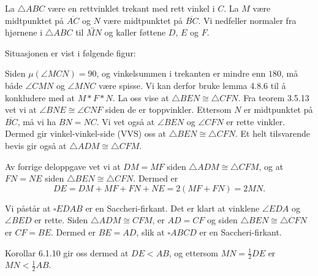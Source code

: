 \begin{oppgave}[6.1.5]
    La $\triangle ABC$ være en rettvinklet trekant med rett vinkel i $C$. 
    La $M$ være midtpunktet på $\overline{AC}$ og $N$ være midtpunktet på $\overline{BC}$. 
    Vi nedfeller normaler fra hjørnene i $\triangle ABC$ til $\overleftrightarrow{MN}$ og kaller føttene $D$, $E$ og $F$. 

    \begin{punkt}
        Situasjonen er vist i følgende figur: 

        \begin{figure}[H]
            \centering
             
        \end{figure}
    \end{punkt}

    \begin{punkt}
        Siden $\mu(\angle MCN)=90$, og vinkelsummen i trekanten er mindre enn $180$, må både $\angle CMN$ og $\angle MNC$ være spisse. 
        Vi kan derfor bruke lemma 4.8.6 til å konkludere med at $M\ast F\ast N$. 
        La oss vise at $\triangle BEN\cong \triangle CFN$. 
        Fra teorem 3.5.13 vet vi at $\angle BNE \cong \angle CNF$ siden de er toppvinkler. 
        Ettersom $N$ er midtpunktet på $\overline{BC}$, må vi ha $BN=NC$.
        Vi vet også at $\angle BEN$ og $\angle CFN$ er rette vinkler. 
        Dermed gir vinkel-vinkel-side (VVS) oss at $\triangle BEN \cong \triangle CFN$. 
        Et helt tilsvarende bevis gir også at $\triangle ADM \cong \triangle CFM$. 

        \begin{figure}[H]
            \centering
             
        \end{figure}
    \end{punkt} 

    \begin{punkt}
        Av forrige deloppgave vet vi at $DM=MF$ siden $\triangle ADM \cong \triangle CFM$, og at $FN=NE$ siden $\triangle BEN \cong \triangle CFN$. 
        Dermed er 
        $$DE=DM+MF+FN+NE=2(MF+FN)=2MN.$$

        Vi påstår at $\square EDAB$ er en Saccheri-firkant. 
        Det er klart at vinklene $\angle EDA$ og $\angle BED$ er rette.
        Siden $\triangle ADM \cong CFM$, er $AD=CF$ og siden $\triangle BEN \cong \triangle CFN$ er $CF=BE$. 
        Dermed er $BE=AD$, slik at $\square ABCD$ er en Saccheri-firkant. 

        Korollar 6.1.10 gir oss dermed at $DE<AB$, og ettersom $MN=\frac{1}{2}DE$ er $MN<\frac{1}{2}AB$. 
    \end{punkt}


\end{oppgave}
